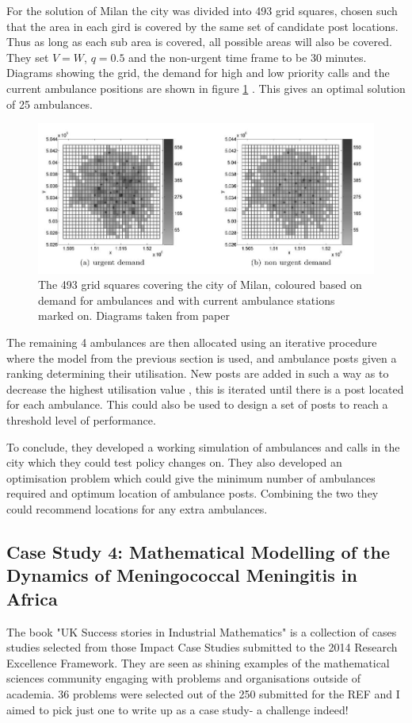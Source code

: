 \documentclass[11pt]{article} %
\begin{document}
 
For the solution of Milan the city was divided into 493 grid squares, chosen such that the area in each gird is covered by the same set of candidate post locations. Thus as long as each sub area is covered, all possible areas will also be covered. They set $ V=W $, $ q=0.5 $ and the non-urgent time frame to be 30 minutes. Diagrams showing the grid, the demand for high and low priority calls and the current ambulance positions are shown in figure \ref{fig:ems-milan} . This gives an optimal solution of 25 ambulances.

\begin{figure}
	\centering
	\includegraphics[width=0.9\linewidth]{"Report_images/ems milan"}
	\caption{The 493 grid squares covering the city of Milan, coloured based on demand for ambulances and with current ambulance stations marked on. Diagrams taken from paper \cite{Carello2013}}
	\label{fig:ems-milan}
\end{figure}

The remaining 4 ambulances are then allocated using an iterative procedure where the model from the previous section is used, and ambulance posts given  a ranking determining their utilisation. New posts are added in such a way as to decrease the highest utilisation value , this is iterated until there is a post located for each ambulance. This could also be used to design a set of posts to reach a threshold level of performance.

To conclude, they developed a working simulation of ambulances and calls in the city which they could test policy changes on. They also developed an optimisation problem which could give the minimum number of ambulances required and optimum location of ambulance posts. Combining the two they could recommend locations for any extra ambulances.



	\subsection{Case Study 4: Mathematical Modelling of the Dynamics of Meningococcal Meningitis in Africa \label{Africa }}
The book "UK Success stories in Industrial Mathematics" \cite{Aston2016} is a collection of cases studies selected from those Impact Case Studies submitted to the 2014 Research Excellence Framework. They are seen as shining examples of the mathematical sciences community engaging with problems and organisations outside of academia. 36 problems were selected out of the 250 submitted for the REF and I aimed to pick just one to write up as a case study- a challenge indeed!
\end{document}

